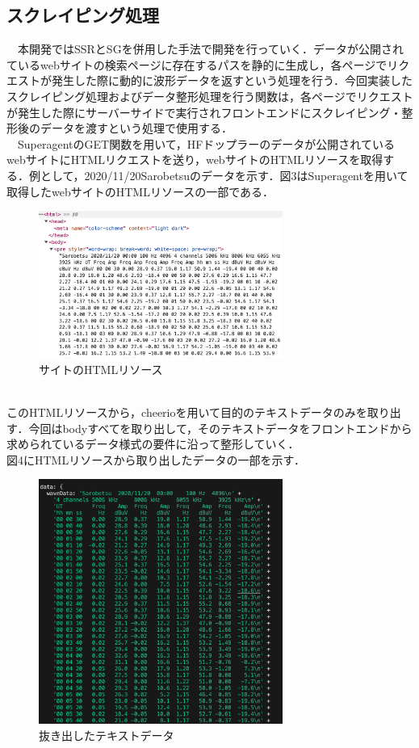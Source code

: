 \subsection{スクレイピング処理}
　本開発ではSSRとSGを併用した手法で開発を行っていく．データが公開されているwebサイトの検索ページに存在するパスを静的に生成し，各ページでリクエストが発生した際に動的に波形データを返すという処理を行う．今回実装したスクレイピング処理およびデータ整形処理を行う関数は，各ページでリクエストが発生した際にサーバーサイドで実行されフロントエンドにスクレイピング・整形後のデータを渡すという処理で使用する．\\
　SuperagentのGET関数を用いて，HFドップラーのデータが公開されているwebサイト\cite{hfd_link}にHTMLリクエストを送り，webサイトのHTMLリソースを取得する．例として，2020/11/20Sarobetsuのデータを示す．図3はSuperagentを用いて取得したwebサイトのHTMLリソースの一部である．\\
\begin{figure}[h]
  \centering
  \includegraphics[width=80mm]{fig/htmlRes.png}
  \caption{サイトのHTMLリソース}
\end{figure}\\
このHTMLリソースから，cheerioを用いて目的のテキストデータのみを取り出す．今回はbodyすべてを取り出して，そのテキストデータをフロントエンドから求められているデータ様式の要件に沿って整形していく．\\
図4にHTMLリソースから取り出したデータの一部を示す．
\begin{figure}[h]
   \centering
   \includegraphics[width=80mm]{fig/textData.png}
   \caption{抜き出したテキストデータ}
\end{figure}

